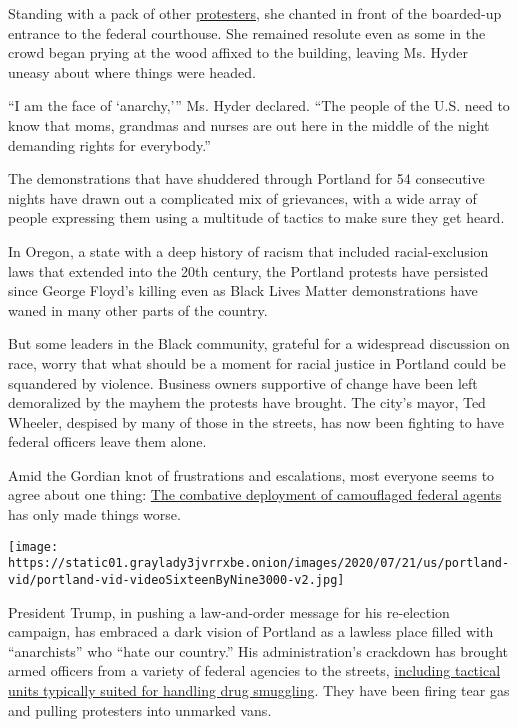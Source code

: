Standing with a pack of other
\href{https://www.nytimes3xbfgragh.onion/interactive/2020/07/22/us/portland-protests.html}{protesters},
she chanted in front of the boarded-up entrance to the federal
courthouse. She remained resolute even as some in the crowd began prying
at the wood affixed to the building, leaving Ms. Hyder uneasy about
where things were headed.

``I am the face of `anarchy,''' Ms. Hyder declared. ``The people of the
U.S. need to know that moms, grandmas and nurses are out here in the
middle of the night demanding rights for everybody.''

The demonstrations that have shuddered through Portland for 54
consecutive nights have drawn out a complicated mix of grievances, with
a wide array of people expressing them using a multitude of tactics to
make sure they get heard.

In Oregon, a state with a deep history of racism that included
racial-exclusion laws that extended into the 20th century, the Portland
protests have persisted since George Floyd's killing even as Black Lives
Matter demonstrations have waned in many other parts of the country.

But some leaders in the Black community, grateful for a widespread
discussion on race, worry that what should be a moment for racial
justice in Portland could be squandered by violence. Business owners
supportive of change have been left demoralized by the mayhem the
protests have brought. The city's mayor, Ted Wheeler, despised by many
of those in the streets, has now been fighting to have federal officers
leave them alone.

Amid the Gordian knot of frustrations and escalations, most everyone
seems to agree about one thing:
\href{https://www.nytimes3xbfgragh.onion/2020/07/17/us/portland-protests.html}{The
combative deployment of camouflaged federal agents} has only made things
worse.

\texttt{[image: https://static01.graylady3jvrrxbe.onion/images/2020/07/21/us/portland-vid/portland-vid-videoSixteenByNine3000-v2.jpg]}

President Trump, in pushing a law-and-order message for his re-election
campaign, has embraced a dark vision of Portland as a lawless place
filled with ``anarchists'' who ``hate our country.'' His
administration's crackdown has brought armed officers from a variety of
federal agencies to the streets,
\href{https://www.nytimes3xbfgragh.onion/2020/07/18/us/portland-protests.html}{including
tactical units typically suited for handling drug smuggling}. They have
been firing tear gas and pulling protesters into unmarked vans.

